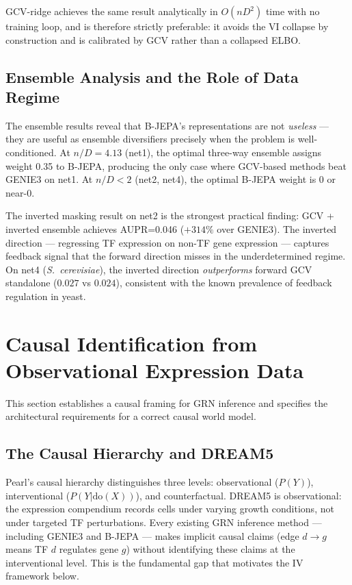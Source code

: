 \documentclass[11pt]{article}
\begin{document}
GCV-ridge achieves the same result analytically in $O(n D^2)$ time with no
training loop, and is therefore strictly preferable: it avoids the VI collapse
by construction and is calibrated by GCV rather than a collapsed ELBO.

\subsection{Ensemble Analysis and the Role of Data Regime}

The ensemble results reveal that B-JEPA's representations are not \emph{useless}
--- they are useful as ensemble diversifiers precisely when the problem is
well-conditioned.
At $n/D = 4.13$ (net1), the optimal three-way ensemble assigns weight 0.35 to
B-JEPA, producing the only case where GCV-based methods beat GENIE3 on net1.
At $n/D < 2$ (net2, net4), the optimal B-JEPA weight is 0 or near-0.

The inverted masking result on net2 is the strongest practical finding:
GCV + inverted ensemble achieves AUPR=0.046 ($+314\%$ over GENIE3).
The inverted direction --- regressing TF expression on non-TF gene expression ---
captures feedback signal that the forward direction misses in the
underdetermined regime.
On net4 (\textit{S.~cerevisiae}), the inverted direction \emph{outperforms}
forward GCV standalone ($0.027$ vs $0.024$), consistent with the known
prevalence of feedback regulation in yeast.

\section{Causal Identification from Observational Expression Data}

This section establishes a causal framing for GRN inference and specifies the
architectural requirements for a correct causal world model.

\subsection{The Causal Hierarchy and DREAM5}

Pearl's causal hierarchy \citep{pearl2009} distinguishes three levels:
observational ($P(Y)$), interventional ($P(Y | \mathrm{do}(X))$), and
counterfactual.
DREAM5 is observational: the expression compendium records cells under varying
growth conditions, not under targeted TF perturbations.
Every existing GRN inference method --- including GENIE3 and B-JEPA --- makes
implicit causal claims (edge $d \to g$ means TF $d$ regulates gene $g$) without
identifying these claims at the interventional level.
This is the fundamental gap that motivates the IV framework below.
\end{document}
